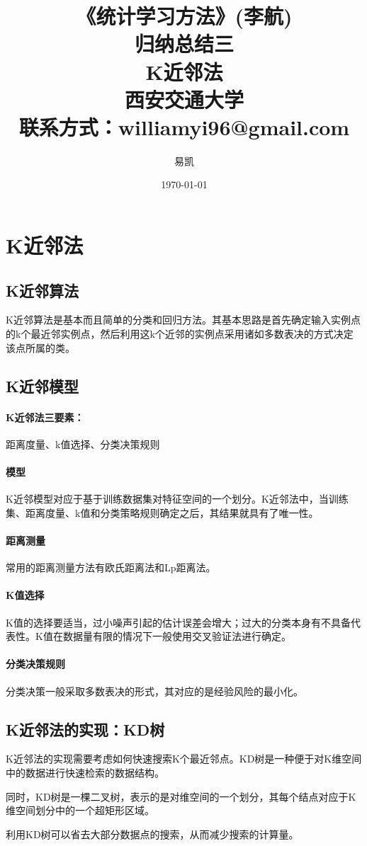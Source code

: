 \documentclass[UTF8]{ctexart}
\title{\Huge{《统计学习方法》(李航)\\归纳总结三\\K近邻法\\} \huge{西安交通大学 \\ 联系方式：williamyi96@gmail.com\\ }}
\author{\huge{易凯}}
\date{\Huge\today}
\begin{document}
	\maketitle
	\vspace{100mm}
	\newpage
	\tableofcontents
	\newpage

	\section{K近邻法}
	\subsection{K近邻算法}
	K近邻算法是基本而且简单的分类和回归方法。其基本思路是首先确定输入实例点的k个最近邻实例点，然后利用这k个近邻的实例点采用诸如多数表决的方式决定该点所属的类。

	\subsection{K近邻模型}
	\paragraph{K近邻法三要素：} 
	距离度量、k值选择、分类决策规则

	\paragraph{模型}
	K近邻模型对应于基于训练数据集对特征空间的一个划分。K近邻法中，当训练集、距离度量、k值和分类策略规则确定之后，其结果就具有了唯一性。

	\paragraph{距离测量}
	常用的距离测量方法有欧氏距离法和Lp距离法。

	\paragraph{K值选择}
	K值的选择要适当，过小噪声引起的估计误差会增大；过大的分类本身有不具备代表性。K值在数据量有限的情况下一般使用交叉验证法进行确定。

	\paragraph{分类决策规则}
	分类决策一般采取多数表决的形式，其对应的是经验风险的最小化。

	\subsection{K近邻法的实现：KD树}
	K近邻法的实现需要考虑如何快速搜索K个最近邻点。KD树是一种便于对K维空间中的数据进行快速检索的数据结构。

	同时，KD树是一棵二叉树，表示的是对维空间的一个划分，其每个结点对应于K维空间划分中的一个超矩形区域。

	利用KD树可以省去大部分数据点的搜索，从而减少搜索的计算量。
\end{document}
